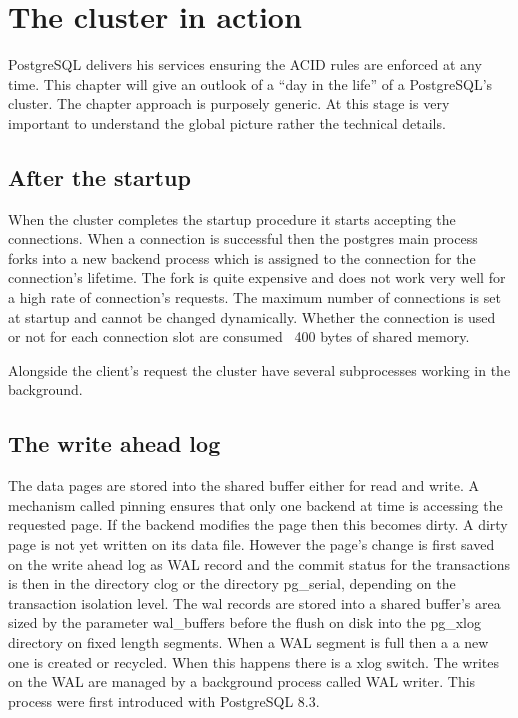 \chapter{The cluster in action}
PostgreSQL delivers his services ensuring the ACID rules are enforced at any time. This chapter will give 
an outlook of a ``day in the life'' of a PostgreSQL's cluster. The chapter approach is purposely generic. 
At this stage is very important to understand the global picture rather the technical details. 

\section{After the startup}
When the cluster completes the startup procedure it starts accepting the connections. When a connection  
is successful then the postgres main process forks into a new backend process which is assigned to the 
connection for the connection's lifetime. The fork is quite expensive and does not work very well for a 
high rate of connection's requests. The maximum number of connections is set at startup and cannot be 
changed dynamically. Whether the connection is used or not for each connection slot are consumed ~400 bytes 
of shared memory.\newline

Alongside the client's request the cluster have several subprocesses working in the background. 

\section{The write ahead log} 
The data pages are stored into the shared buffer either for read and write. A mechanism called pinning 
ensures that only one backend at time is accessing the requested page. If the backend modifies the page then 
this becomes dirty. A dirty page is not yet written on its data file. However the page's 
change is first saved on the write ahead log as WAL record and the commit status for the transactions is 
then in the directory clog or the directory pg\_serial, depending on the transaction isolation level. The 
wal records are stored into a shared buffer's area sized by the parameter wal\_buffers before the flush on 
disk into the pg\_xlog directory on fixed length segments. When a WAL segment is full then a a new one is 
created or recycled. When this happens there is a xlog switch. The writes on the WAL are managed by a 
background process called WAL writer. This process were first introduced with PostgreSQL 
8.3.

